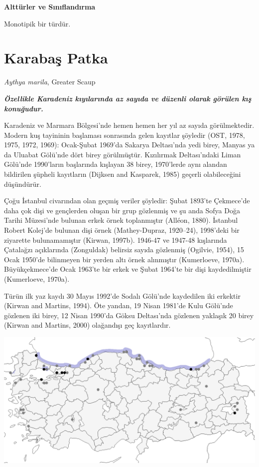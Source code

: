 \documentclass[
  a4paper,
  DIV=11,
  numbers=noendperiod]{scrartcl}
\begin{document}
\textbf{Alttürler ve Sınıflandırma}

Monotipik bir türdür.

\section{Karabaş Patka}\label{karabaux15f-patka}

\emph{Aythya marila}, Greater Scaup

\textbf{\emph{Özellikle Karadeniz kıyılarında az sayıda ve düzenli
olarak görülen kış konuğudur.}}

Karadeniz ve Marmara Bölgesi'nde hemen hemen her yıl az sayıda
görülmektedir. Modern kuş tayininin başlaması sonrasında gelen kayıtlar
şöyledir (OST, 1978, 1975, 1972, 1969): Ocak-Şubat 1969'da Sakarya
Deltası'nda yedi birey, Manyas ya da Uluabat Gölü'nde dört birey
görülmüştür. Kızılırmak Deltası'ndaki Liman Gölü'nde 1990'ların
başlarında kışlayan 38 birey, 1970'lerde aynı alandan bildirilen şüpheli
kayıtların (Dijksen and Kasparek, 1985) geçerli olabileceğini
düşündürür.

Çoğu İstanbul civarından olan geçmiş veriler şöyledir: Şubat 1893'te
Çekmece'de daha çok dişi ve gençlerden oluşan bir grup gözlenmiş ve şu
anda Sofya Doğa Tarihi Müzesi'nde bulunan erkek örnek toplanmıştır
(Alléon, 1880). İstanbul Robert Kolej'de bulunan dişi örnek
(Mathey-Dupraz, 1920--24), 1998'deki bir ziyarette bulunamamıştır
(Kirwan, 1997b). 1946-47 ve 1947-48 kışlarında Çatalağzı açıklarında
(Zonguldak) belirsiz sayıda gözlenmiş (Ogilvie, 1954), 15 Ocak 1950'de
bilinmeyen bir yerden altı örnek alınmıştır (Kumerloeve, 1970a).
Büyükçekmece'de Ocak 1963'te bir erkek ve Şubat 1964'te bir dişi
kaydedilmiştir (Kumerloeve, 1970a).

Türün ilk yaz kaydı 30 Mayıs 1992'de Sodalı Gölü'nde kaydedilen iki
erkektir (Kirwan and Martins, 1994). Öte yandan, 19 Nisan 1981'de Kulu
Gölü'nde gözlenen iki birey, 12 Nisan 1990'da Göksu Deltası'nda gözlenen
yaklaşık 20 birey (Kirwan and Martins, 2000) olağandışı geç kayıtlardır.

\includegraphics{images/harita_Aythya marila.png}
\end{document}
